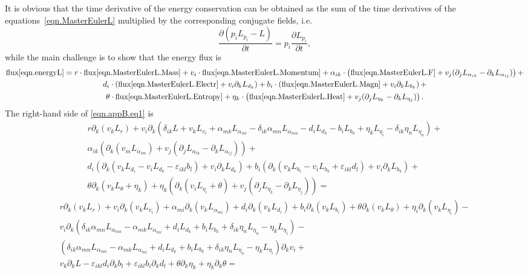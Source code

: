 \documentclass[twoside]{article}
\newcommand{\pd}{\partial}
\newcommand{\eps}{\varepsilon}
\begin{document}
It is obvious that the time derivative of the energy conservation can be 
obtained as the sum of the time derivatives of the 
equations~\eqref{eqn.MasterEulerL} multiplied by the corresponding conjugate 
fields, i.e.
\begin{equation}
\frac{\pd (p_i L_{p_i} - L)}{\pd t} = p_i \frac{\pd L_{p_i}}{\pd t},
\end{equation}
while the main challenge is to show that the energy flux is 
\begin{multline}\label{eqn.appB.eq1}
\text{flux}\eqref{eqn.energyL} = r\cdot 
\text{flux}\eqref{eqn.MasterEulerL.Mass} + 
v_i\cdot\text{flux}\eqref{eqn.MasterEulerL.Momentum} + 
\alpha_{ik}\cdot\left (\text{flux}\eqref{eqn.MasterEulerL.F} + v_j(\pd_j 
L_{\alpha_{ik}} - \pd_k L_{\alpha_{ij}})\right ) + \\
d_i\cdot\left (\text{flux}\eqref{eqn.MasterEulerL.Electr} + v_i\pd_k 
L_{d_k} \right ) + 
b_i\cdot\left (\text{flux}\eqref{eqn.MasterEulerL.Magn} + v_i\pd_k 
L_{b_k} \right ) +\\ 
\theta\cdot \text{flux}\eqref{eqn.MasterEulerL.Entropy} +
\eta_k\cdot\left (\text{flux}\eqref{eqn.MasterEulerL.Heat} + v_j(\pd_j 
L_{\eta_k} - \pd_k L_{\eta_j})\right ).
\end{multline}
The right-hand side of \eqref{eqn.appB.eq1} is 
\begin{gather}\label{eqn.appB.eq2}
r\pd_k(v_k L_r) + v_i\pd_k \left(\delta_{ik} L + v_k L_{v_i}  + 
	\alpha_{mk}L_{\alpha_{mi}} - \delta_{ik}\alpha_{mn}L_{\alpha_{mn}} 
	- d_i L_{d_k} - b_i L_{b_k} + 
	\eta_{k}L_{\eta_{i}} - \delta_{ik}\eta_n L_{\eta_n}\right) + 
	\nonumber\\[1mm]
%
\alpha_{ik}\left (\pd_k  (v_m L_{\alpha_{im}}) + 
	v_j(\pd_j L_{\alpha_{ik}} - \pd_k L_{\alpha_{ij}})\right ) + 
	\nonumber\\[1mm]
%
d_i\left (\pd_k( v_k L_{d_i} - v_i L_{d_k} - \varepsilon_{ikl}b_l) + v_i \pd_k 
L_{d_k} \right ) +
% 
b_i\left( \pd_k( v_k L_{b_i} - v_i L_{b_k} + \varepsilon_{ikl}d_l) + v_i \pd_k 
L_{b_k} \right) + \nonumber\\[1mm]
%
\theta \pd_k(v_k L_\theta + \eta_k) + 
\eta_k\left(\pd_k (v_i L_{\eta_i} + \theta) + v_j(\pd_j 
L_{\eta_k} - \pd_k L_{\eta_j})\right )  = 
\end{gather}
\begin{gather}\label{eqn.appB.eq3}
r\pd_k(v_k L_r) + v_i\pd_k ( v_k L_{v_i}) + \alpha_{mi} \pd_k(v_k 
L_{\alpha_{mi}}) + d_i \pd_k(v_k L_{d_i}) + b_i \pd_k(v_k L_{b_i}) + 
\theta\pd_k(v_k L_\theta) + \eta_i\pd_k(v_k L_{\eta_i}) - \nonumber \\
%
v_i \pd_k \left(\delta_{ik}\alpha_{mn}L_{\alpha_{mn}} - 
\alpha_{mk}L_{\alpha_{mi}} + d_i L_{d_k} + b_i L_{b_k} + \delta_{ik} \eta_n 
L_{\eta_n} - \eta_k L_{\eta_i} \right)  - \nonumber\\[1mm]
%
\left(\delta_{ik}\alpha_{mn}L_{\alpha_{mn}} - 
\alpha_{mk}L_{\alpha_{mi}} + d_i L_{d_k} + b_i L_{b_k} + \delta_{ik} \eta_n 
L_{\eta_n} - \eta_k L_{\eta_i} \right)\pd_k v_i + \nonumber\\[1mm]
v_k \pd_k L - \eps_{ikl}d_i\pd_k b_l + \eps_{ikl}b_i\pd_k d_l +
%
\theta\pd_k\eta_k + \eta_k\pd_k\theta = 
\end{gather}
\end{document}
